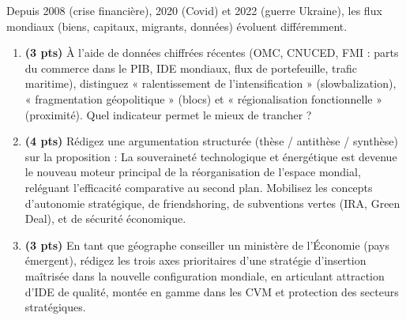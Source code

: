 \documentclass[11pt]{article}
\begin{document}
\begin{exercice}
Depuis 2008 (crise financière), 2020 (Covid) et 2022 (guerre Ukraine), les flux mondiaux (biens, capitaux, migrants, données) évoluent différemment.

\begin{enumerate}
    \item \textbf{(3 pts)} À l'aide de données chiffrées récentes (OMC, CNUCED, FMI : parts du commerce dans le PIB, IDE mondiaux, flux de portefeuille, trafic maritime), distinguez « ralentissement de l'intensification » (slowbalization), « fragmentation géopolitique » (blocs) et « régionalisation fonctionnelle » (proximité). Quel indicateur permet le mieux de trancher ?
    \item \textbf{(4 pts)} Rédigez une argumentation structurée (thèse / antithèse / synthèse) sur la proposition : \og La souveraineté technologique et énergétique est devenue le nouveau moteur principal de la réorganisation de l'espace mondial, reléguant l'efficacité comparative au second plan. \fg Mobilisez les concepts d'autonomie stratégique, de friendshoring, de subventions vertes (IRA, Green Deal), et de sécurité économique.
    \item \textbf{(3 pts)} En tant que géographe conseiller un ministère de l'Économie (pays émergent), rédigez les trois axes prioritaires d'une stratégie d'insertion maîtrisée dans la nouvelle configuration mondiale, en articulant attraction d'IDE de qualité, montée en gamme dans les CVM et protection des secteurs stratégiques.
\end{enumerate}
\end{exercice}
\end{document}
